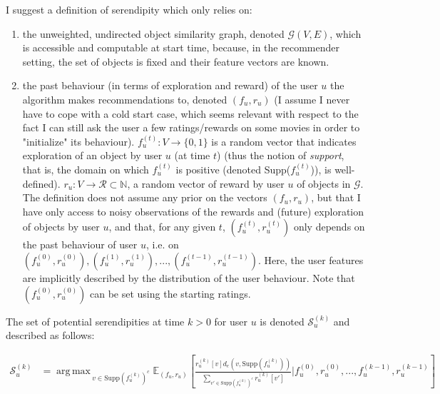 \documentclass{article}
\DeclareMathOperator*{\argmax}{arg\,max\,}
\begin{document}
I suggest a definition of serendipity which only relies on:
\begin{enumerate} 
\item the unweighted, undirected object similarity graph, denoted $\mathscr{G}(V, E)$, which is accessible and computable at start time, because, in the recommender setting, the set of objects is fixed and their feature vectors are known.
\item the past behaviour (in terms of exploration and reward) of the user $u$ the algorithm makes recommendations to, denoted $(f_{u}, r_{u})$ (I assume I never have to cope with a cold start case, which seems relevant with respect to the fact I can still ask the user a few ratings/rewards on some movies in order to "initialize" its behaviour). $f^{(t)}_u : V \rightarrow \{0,1\}$ is a random vector that indicates exploration of an object by user $u$ (at time $t$) (thus the notion of \textit{support}, that is, the domain on which $f^{(t)}_{u}$ is positive (denoted Supp($f^{(t)}_{u}$)), is well-defined). $r_u : V \rightarrow \mathscr{R} \subset \mathbb{N}$, a random vector of reward by user $u$ of objects in $\mathscr{G}$. The definition does not assume any prior on the vectors $(f_{u}, r_{u})$, but that I have only access to noisy observations of the rewards and (future) exploration of objects by user $u$, and that, for any given $t$, $(f^{(t)}_{u}, r^{(t)}_{u})$ only depends on the past behaviour of user $u$, i.e. on $(f^{(0)}_{u}, r^{(0)}_{u}), (f^{(1)}_{u}, r^{(1)}_{u}), ..., (f^{(t-1)}_{u}, r^{(t-1)}_{u})$. Here, the user features are implicitly described by the distribution of the user behaviour. Note that $(f^{(0)}_{u}, r^{(0)}_{u})$ can be set using the starting ratings.
\end{enumerate}

The set of potential serendipities at time $k > 0$ for user $u$ is denoted $\mathscr{S}^{(k)}_{u}$ and described as follows:

\begin{equation}\label{eq:02}
\begin{split}
\mathscr{S}^{(k)}_{u} & = \argmax_{v \in \text{Supp}(f^{(k)}_{u})^{c}} \mathbb{E}_{(f_{u},r_{u})}[\frac{r^{(k)}_{u}[v]d_e(v, \text{Supp}(f^{(k)}_{u}))}{\sum_{v' \in \text{Supp}(f^{(k)}_{u})^{c}} r^{(k)}_{u}[v']} | f^{(0)}_{u}, r^{(0)}_{u}, ..., f^{(k-1)}_{u}, r^{(k-1)}_{u} ]\\
\end{split}
\end{equation}
\end{document}
